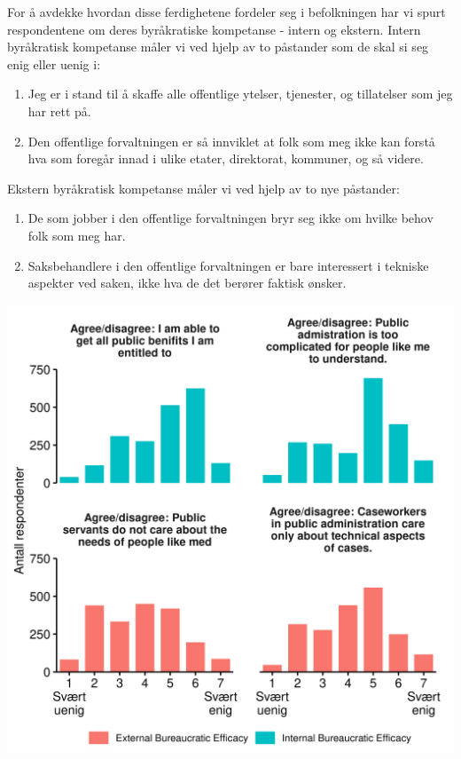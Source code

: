 \documentclass[
]{book}
\begin{document}
For å avdekke hvordan disse ferdighetene fordeler seg i befolkningen har vi spurt respondentene om deres byråkratiske kompetanse - intern og ekstern.
Intern byråkratisk kompetanse måler vi ved hjelp av to påstander som de skal si seg enig eller uenig i:

\begin{enumerate}
\def\labelenumi{\arabic{enumi}.}
\item
  Jeg er i stand til å skaffe alle offentlige ytelser, tjenester, og tillatelser som jeg har rett på.
\item
  Den offentlige forvaltningen er så innviklet at folk som meg ikke kan forstå hva som foregår innad i ulike etater, direktorat, kommuner, og så videre.
\end{enumerate}

Ekstern byråkratisk kompetanse måler vi ved hjelp av to nye påstander:

\begin{enumerate}
\def\labelenumi{\arabic{enumi}.}
\item
  De som jobber i den offentlige forvaltningen bryr seg ikke om hvilke behov folk som meg har.
\item
  Saksbehandlere i den offentlige forvaltningen er bare interessert i tekniske aspekter ved saken, ikke hva de det berører faktisk ønsker.
\end{enumerate}

\includegraphics{figs/png/fig_be_hist.png}
\end{document}
